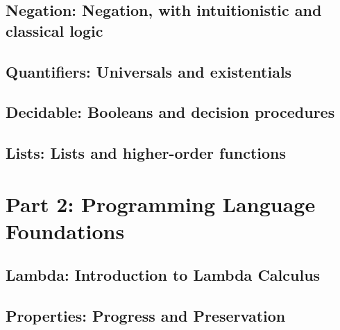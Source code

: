 \documentclass[10pt]{book}
\begin{document}
\hypertarget{negation}{%
  \chapter{Negation: Negation, with intuitionistic and classical logic}\label{negation}}


\hypertarget{quantifiers}{%
  \chapter{Quantifiers: Universals and existentials}\label{quantifiers}}


\hypertarget{decidable}{%
  \chapter{Decidable: Booleans and decision procedures}\label{decidable}}


\hypertarget{lists}{%
  \chapter{Lists: Lists and higher-order functions}\label{lists}}





\cleardoublepage%
%









\part{Part 2: Programming Language Foundations}



\hypertarget{lambda}{%
  \chapter{Lambda: Introduction to Lambda Calculus}\label{lambda}}


\hypertarget{properties}{%
  \chapter{Properties: Progress and Preservation}\label{properties}}

\end{document}

